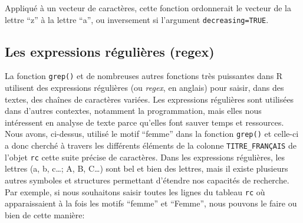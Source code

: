 \documentclass[
  letterpaper,
  DIV=11,
  numbers=noendperiod]{scrartcl}
\newenvironment{Shaded}{\begin{snugshade}}{\end{snugshade}}
\newcommand{\AttributeTok}[1]{\textcolor[rgb]{0.40,0.45,0.13}{#1}}
\newcommand{\FunctionTok}[1]{\textcolor[rgb]{0.28,0.35,0.67}{#1}}
\newcommand{\NormalTok}[1]{\textcolor[rgb]{0.00,0.23,0.31}{#1}}
\newcommand{\SpecialCharTok}[1]{\textcolor[rgb]{0.37,0.37,0.37}{#1}}
\newcommand{\StringTok}[1]{\textcolor[rgb]{0.13,0.47,0.30}{#1}}
\begin{document}
Appliqué à un vecteur de caractères, cette fonction ordonnerait le
vecteur de la lettre ``z'' à la lettre ``a'', ou inversement si
l'argument \texttt{decreasing=TRUE}.

\hypertarget{les-expressions-ruxe9guliuxe8res-regex}{%
\subsection{Les expressions régulières
(regex)}\label{les-expressions-ruxe9guliuxe8res-regex}}

La fonction \texttt{grep()} et de nombreuses autres fonctions très
puissantes dans R utilisent des expressions régulières (ou \emph{regex},
en anglais) pour saisir, dans des textes, des chaînes de caractères
variées. Les expressions régulières sont utilisées dans d'autres
contextes, notamment la programmation, mais elles nous intéressent en
analyse de texte parce qu'elles font sauver temps et ressources. Nous
avons, ci-dessus, utilisé le motif ``femme'' dans la fonction
\texttt{grep()} et celle-ci a donc cherché à travers les différents
éléments de la colonne \texttt{TITRE\_FRANÇAIS} de l'objet \texttt{rc}
cette suite précise de caractères. Dans les expressions régulières, les
lettres (a, b, c\ldots; A, B, C\ldots) sont bel et bien des lettres,
mais il existe plusieurs autres symboles et structures permettant
d'étendre nos capacités de recherche. Par exemple, si nous souhaitons
saisir toutes les lignes du tableau \texttt{rc} où apparaissaient à la
fois les motifs ``femme'' et ``Femme'', nous pouvons le faire ou bien de
cette manière:

\begin{Shaded}
\end{Shaded}
\end{document}
